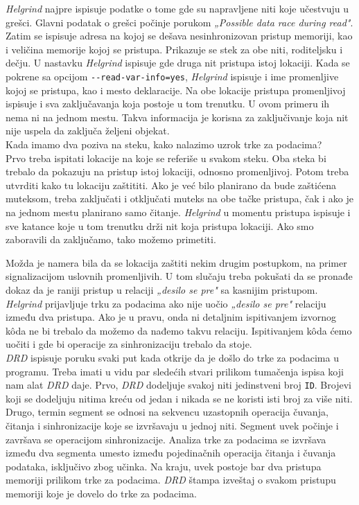 \emph{Helgrind} najpre ispisuje podatke o tome gde su napravljene niti koje učestvuju u grešci. Glavni podatak o grešci počinje porukom \emph{„Possible data race during read"}. Zatim se ispisuje adresa na kojoj se dešava nesinhronizovan pristup memoriji, kao i veličina memorije kojoj se pristupa. Prikazuje se stek za obe niti, roditeljsku i dečju. U nastavku \emph{Helgrind} ispisuje gde druga nit pristupa istoj lokaciji. Kada se pokrene sa opcijom \texttt{-{}-read-var-info=yes}, \emph{Helgrind} ispisuje i ime promenljive kojoj se pristupa, kao i mesto deklaracije. Na obe lokacije pristupa promenljivoj ispisuje i sva zaključavanja koja postoje u tom trenutku. U ovom primeru ih nema ni na jednom mestu. Takva informacija je korisna za zaključivanje koja nit nije uspela da zaključa željeni objekat.\\
Kada imamo dva poziva na steku, kako nalazimo uzrok trke za podacima?\\
Prvo treba ispitati lokacije na koje se referiše u svakom steku. Oba steka bi trebalo da pokazuju na pristup istoj lokaciji, odnosno promenljivoj. Potom treba utvrditi kako tu lokaciju zaštititi. Ako je već bilo planirano da bude zaštićena muteksom, treba zaključati i otključati muteks na obe tačke pristupa, čak i ako je na jednom mestu planirano samo čitanje. \emph{Helgrind} u momentu pristupa ispisuje i sve katance koje u tom trenutku drži nit koja pristupa lokaciji. Ako smo zaboravili da zaključamo, tako možemo primetiti.

Možda je namera bila da se lokacija zaštiti nekim drugim postupkom, na primer signalizacijom uslovnih promenljivih. U tom slučaju treba pokušati da se pronađe dokaz da je raniji pristup u relaciji \emph{„desilo se pre"} sa kasnijim pristupom. \emph{Helgrind} prijavljuje trku za podacima ako nije uočio \emph{„desilo se pre"} relaciju između dva pristupa. Ako je u pravu, onda ni detaljnim ispitivanjem izvornog kôda ne bi trebalo da možemo da nađemo takvu relaciju. Ispitivanjem kôda ćemo uočiti i gde bi operacije za sinhronizaciju trebalo da stoje.\\
\emph{DRD} ispisuje poruku svaki put kada otkrije da je došlo do trke za podacima u programu. Treba imati u vidu par sledećih stvari prilikom tumačenja ispisa koji nam alat \emph{DRD} daje. Prvo, \emph{DRD} dodeljuje svakoj niti jedinstveni broj \texttt{ID}. Brojevi koji se dodeljuju nitima kreću od jedan i nikada se ne koristi isti broj za više niti. Drugo, termin segment se odnosi na sekvencu uzastopnih operacija čuvanja, čitanja i sinhronizacije koje se izvršavaju u jednoj niti. Segment uvek počinje i završava se operacijom sinhronizacije. Analiza trke za podacima se izvršava između dva segmenta umesto između pojedinačnih operacija čitanja i čuvanja podataka, isključivo zbog učinka. Na kraju, uvek postoje bar dva pristupa memoriji prilikom trke za podacima. \emph{DRD} štampa izveštaj o svakom pristupu memoriji koje je dovelo do trke za podacima.

